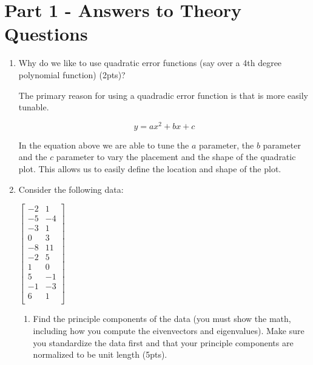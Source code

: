 \documentclass[12pt]{article}
\begin{document}
\maketitle
\section*{Part 1 - Answers to Theory Questions}
\begin{enumerate}
\item Why do we like to use quadratic error functions (say over a 4th degree polynomial function) (2pts)?

\noindent
The primary reason for using a quadradic error function is that is more easily tunable. 

\begin{equation}
y = ax^2 + bx + c
\end{equation}

In the equation above we are able to tune the $a$ parameter, the $b$ parameter and the $c$ parameter to vary the placement and the shape of the quadratic plot. This allows us to easily define the location and shape of the plot.


\newpage
\item Consider the following data:\\
\begin{center}
$
 \begin{bmatrix}
	-2 & 1\\
	-5 & -4\\	
	-3 & 1\\
	0 & 3\\
	-8 & 11\\
	-2 & 5\\
	1 & 0\\
	5 & -1\\
	-1 & -3\\
	6 & 1\\
\end{bmatrix}
$
\end{center}
	\begin{enumerate}
	\item Find the principle components of the data (you must show the math, including how you compute the eivenvectors and eigenvalues).  Make sure you standardize the data first and that your principle components are normalized to be unit length (5pts).

\hfill \break
\hfill \break


\end{enumerate}
\end{enumerate}
\end{document}
